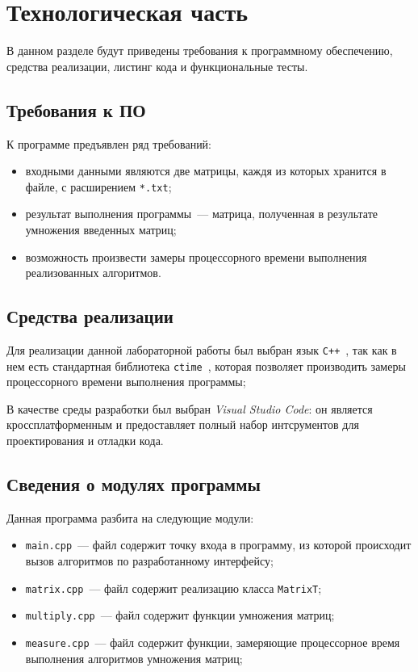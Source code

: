 \chapter{Технологическая часть}
В данном разделе будут приведены требования к программному обеспечению, средства реализации, листинг кода и функциональные тесты.

\section{Требования к ПО}
К программе предъявлен ряд требований:
\begin{itemize}
    \item входными данными являются две матрицы, каждя из которых хранится в файле, с расширением \texttt{*.txt};
    \item результат выполнения программы~--- матрица, полученная в результате умножения введенных матриц;
    \item возможность произвести замеры процессорного времени выполнения реализованных алгоритмов.
\end{itemize}

\section{Средства реализации}
Для реализации данной лабораторной работы был выбран язык \texttt{C++}~\cite{cpp-lang}, так как в нем есть стандартная библиотека \texttt{ctime}~\cite{cpp-lang}, которая позволяет производить замеры процессорного времени выполнения программы;

В качестве среды разработки был выбран \textit{Visual Studio Code}: он является кроссплатформенным и предоставляет полный набор интсрументов для проектирования и отладки кода.
 
\section{Сведения о модулях программы}
Данная программа разбита на следующие модули:

\begin{itemize}
	\item \texttt{main.cpp}~--- файл содержит точку входа в программу, из которой происходит вызов алгоритмов по разработанному интерфейсу;
	\item \texttt{matrix.cpp}~--- файл содержит реализацию класса \texttt{MatrixT};
	\item \texttt{multiply.cpp}~--- файл содержит функции умножения матриц;
	\item \texttt{measure.cpp}~--- файл содержит функции, замеряющие процессорное время выполнения алгоритмов умножения матриц;
\end{itemize}

